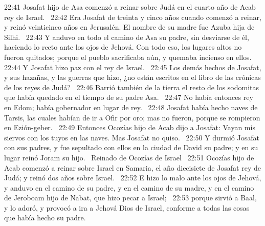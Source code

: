 22:41 Josafat hijo de Asa comenzó a reinar sobre Judá en el cuarto año de Acab rey de Israel.  
22:42 Era Josafat de treinta y cinco años cuando comenzó a reinar, y reinó veinticinco años en Jerusalén. El nombre de su madre fue Azuba hija de Silhi.  
22:43 Y anduvo en todo el camino de Asa su padre, sin desviarse de él, haciendo lo recto ante los ojos de Jehová. Con todo eso, los lugares altos no fueron quitados; porque el pueblo sacrificaba aún, y quemaba incienso en ellos.  
22:44 Y Josafat hizo paz con el rey de Israel.  
22:45 Los demás hechos de Josafat, y sus hazañas, y las guerras que hizo, ¿no están escritos en el libro de las crónicas de los reyes de Judá?  
22:46 Barrió también de la tierra el resto de los sodomitas que había quedado en el tiempo de su padre Asa.  
22:47 No había entonces rey en Edom; había gobernador en lugar de rey.  
22:48 Josafat había hecho naves de Tarsis, las cuales habían de ir a Ofir por oro; mas no fueron, porque se rompieron en Ezión-geber.  
22:49 Entonces Ocozías hijo de Acab dijo a Josafat: Vayan mis siervos con los tuyos en las naves. Mas Josafat no quiso.  
22:50 Y durmió Josafat con sus padres, y fue sepultado con ellos en la ciudad de David su padre; y en su lugar reinó Joram su hijo.  
Reinado de Ocozías de Israel  
22:51 Ocozías hijo de Acab comenzó a reinar sobre Israel en Samaria, el año diecisiete de Josafat rey de Judá; y reinó dos años sobre Israel.  
22:52 E hizo lo malo ante los ojos de Jehová, y anduvo en el camino de su padre, y en el camino de su madre, y en el camino de Jeroboam hijo de Nabat, que hizo pecar a Israel;  
22:53 porque sirvió a Baal, y lo adoró, y provocó a ira a Jehová Dios de Israel, conforme a todas las cosas que había hecho su padre.  

